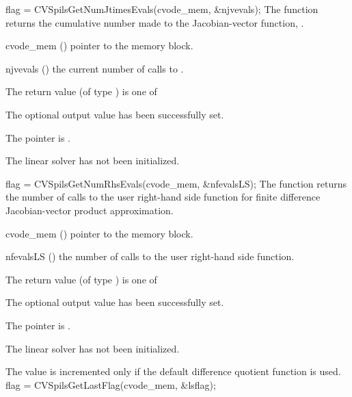 {}
{
  flag = CVSpilsGetNumJtimesEvals(cvode\_mem, \&njvevals);
}
{
  The function  returns the
  cumulative number made to the Jacobian-vector function,
  .
}
{
  \begin{args}
  \item[cvode\_mem] ()
    pointer to the {\cvode} memory block.
  \item[njvevals] ()
    the current number of calls to .
  \end{args}
}
{
  The return value  (of type ) is one of
  \begin{args}
  \item[\Id{CVSPILS\_SUCCESS}] 
    The optional output value has been successfully set.
  \item[\Id{CVSPILS\_MEM\_NULL}]
    The  pointer is .
  \item[\Id{CVSPILS\_LMEM\_NULL}]
    The {\cvspils} linear solver has not been initialized.
  \end{args}
}
{}
{
  flag = CVSpilsGetNumRhsEvals(cvode\_mem, \&nfevalsLS);
}
{
  The function  returns the
  number of calls to the user right-hand side function for
  finite difference Jacobian-vector product approximation.
}
{
  \begin{args}
  \item[cvode\_mem] ()
    pointer to the {\cvode} memory block.
  \item[nfevalsLS] ()
    the number of calls to the user right-hand side function.
  \end{args}
}
{
  The return value  (of type ) is one of
  \begin{args}
  \item[\Id{CVSPILS\_SUCCESS}] 
    The optional output value has been successfully set.
  \item[\Id{CVSPILS\_MEM\_NULL}]
    The  pointer is .
  \item[\Id{CVSPILS\_LMEM\_NULL}]
    The {\cvspils} linear solver has not been initialized.
  \end{args}
}
{
  The value  is incremented only if the default 
   difference quotient function is used.
}
{
  flag = CVSpilsGetLastFlag(cvode\_mem, \&lsflag);
}
